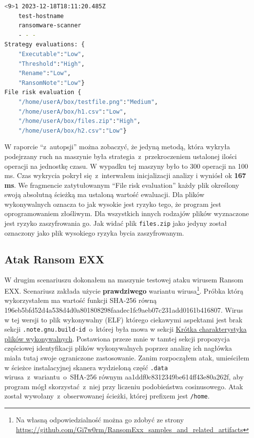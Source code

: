 \begin{lstlisting}[language=bash,
    backgroundcolor=\color{EEGold!5!white},
    caption={Raport wygenerowany ze skanera, który pozwoliłem sobie delikatnie sformatować aby widać było lepiej jego treść.},
    label={lst:raportau}]
    <9>1 2023-12-18T18:11:20.485Z
    test-hostname 
    ransomware-scanner 
    - - -  
Strategy evaluations: {
    "Executable":"Low",
    "Threshold":"High",
    "Rename":"Low",
    "RansomNote":"Low"}
File risk evaluation {
    "/home/userA/box/testfile.png":"Medium",
    "/home/userA/box/h1.csv":"Low",
    "/home/userA/box/files.zip":"High",
    "/home/userA/box/h2.csv":"Low"}
\end{lstlisting}
W raporcie \enquote{z~autopsji} można zobaczyć, że jedyną metodą, która wykryła podejrzany ruch na maszynie była strategia~z~przekroczeniem ustalonej ilości operacji na jednostkę czasu. W wypadku tej maszyny było to 300 operacji na 100 ms. 
Czas wykrycia pokrył się~z~interwałem inicjalizacji analizy i wyniósł ok \textbf{167 ms}.
\newline
We fragmencie zatytułowanym \foreignquote{english}{File risk evaluation} każdy plik określony swoją absolutną ścieżką ma ustaloną wartość ewaluacji. Dla plików wykonywalnych oznacza to jak wysokie jest ryzyko tego, że program jest oprogramowaniem złośliwym. Dla wszystkich innych rodzajów plików wyznaczone jest ryzyko zaszyfrowania go. Jak widać plik \texttt{files.zip} jako jedyny został oznaczony jako plik wysokiego ryzyka bycia zaszyfrowanym.

\subsection{Atak Ransom EXX}
W drugim scenariuszu dokonałem na maszynie testowej ataku wirusem Ransom EXX. Scenariusz zakłada użycie \textbf{prawdziwego} wariantu wirusa\footnote{Na własną odpowiedzialność można go zdobyć ze strony \url{https://github.com/Gi7w0rm/RansomExx_samples_and_related_artifacts}}. Próbka którą wykorzystałem ma wartość funkcji SHA-256 równą 196eb5bfd52d4a538d4d0a801808298faadec1fc9aeb07c231add0161b416807. Wirus w tej wersji to plik wykonywalny (ELF) którego ciekawymi aspektami jest brak sekcji \texttt{.note.gnu.build-id}~o~której była mowa w sekcji \hyperref[sec:elfini]{Krótka charakterystyka plików wykonywalnych}. Postawiona przeze mnie w tamtej sekcji propozycja częściowej identyfikacji plików wykonywalnych poprzez analizę ich nagłówka miała tutaj swoje ograniczone zastosowanie. Zanim rozpocząłem atak, umieściłem w ścieżce instalacyjnej skanera wydzieloną część \texttt{.data} wirusa~z~wariantu~o~SHA-256 równym aa1ddf0c8312349be614ff43e80a262f, aby program mógł skorzystać~z~niej przy liczeniu podobieństwa cosinusowego. Atak został wywołany~z~obserwowanej ścieżki, której prefixem jest \texttt{/home}.

